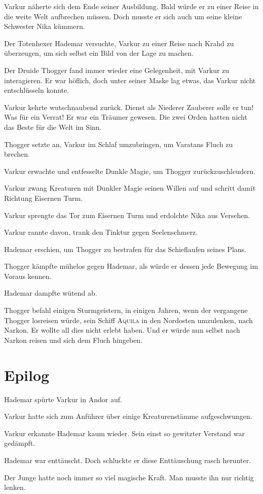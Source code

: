 Varkur näherte sich dem Ende seiner Ausbildung. Bald würde er zu einer Reise in die weite Welt aufbrechen müssen. 
Doch musste er sich auch um seine kleine Schwester Nika kümmern.

Der Totenhexer Hademar versuchte, Varkur zu einer Reise nach Krahd zu überzeugen, um sich selbst ein Bild von der Lage zu machen.

Der Druide Thogger fand immer wieder eine Gelegenheit, mit Varkur zu interagieren. Er war höflich, doch unter seiner Maske lag etwas, das Varkur nicht entschlüsseln konnte.

\trennzeichen

Varkur kehrte wutschnaubend zurück. Dienst als Niederer Zauberer solle er tun! Was für ein Verrat! Er war ein Träumer gewesen. Die zwei Orden hatten nicht das Beste für die Welt im Sinn.

Thogger setzte an, Varkur im Schlaf umzubringen, um Varatans Fluch zu brechen.

Varkur erwachte und entfesselte Dunkle Magie, um Thogger zurückzuschleudern.

Varkur zwang Kreaturen mit Dunkler Magie seinen Willen auf und schritt damit Richtung Eisernen Turm.

Varkur sprengte das Tor zum Eisernen Turm und erdolchte Nika aus Versehen.

Varkur rannte davon, trank den Tinktur gegen Seelenschmerz.

Hademar erschien, um Thogger zu bestrafen für das Schieflaufen seines Plans.

Thogger kämpfte mühelos gegen Hademar, als würde er dessen jede Bewegung im Voraus kennen.

Hademar dampfte wütend ab.

Thogger befahl einigen Sturmgeistern, in einigen Jahren, wenn der vergangene Thogger losreisen würde, sein Schiff \textsc{Aquila} in den Nordosten umzulenken, nach Narkon. Er wollte all dies nicht erlebt haben. Und er würde nun selbst nach Narkon reisen und sich dem Fluch hingeben.


\newpage
\section{Epilog}

Hademar spürte Varkur in Andor auf.

Varkur hatte sich zum Anführer über einige Kreaturenstämme aufgeschwungen.

Varkur erkannte Hademar kaum wieder. Sein einst so gewitzter Verstand war gedämpft. 

Hademar war enttäuscht. Doch schluckte er diese Enttäuschung rasch herunter.

Der Junge hatte noch immer so viel magische Kraft. Man musste ihn nur richtig lenken.



